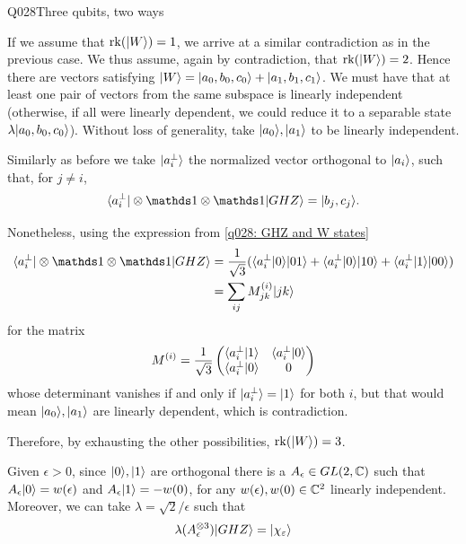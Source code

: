 \begin{entry}{Q028}{Three qubits, two ways}
\begin{solution}[a]
\end{solution}

\begin{solution}[b]
If we assume that $\operatorname{rk}(\lvert W \rangle)=1$, we arrive at a similar contradiction as in the previous case. 
We thus assume, again by contradiction, that $\operatorname{rk}(\lvert W \rangle)=2$. Hence there are vectors satisfying
$\lvert W \rangle= \lvert a_0,b_0,c_0 \rangle+ \lvert a_1,b_1,c_1 \rangle$. We must have that at least one pair of vectors from the same subspace is linearly independent (otherwise, if all were linearly dependent, we could reduce it to a separable state $\lambda\lvert a_0,b_0,c_0 \rangle$). Without loss of generality, take $\lvert a_0 \rangle,\lvert a_1 \rangle$ to be linearly independent.

Similarly as before we take $\lvert a_i^{\perp} \rangle$ the normalized vector orthogonal to $\lvert a_i \rangle$, such that, for $j\neq i$, 
\begin{equation}
     \bra{a_i^{\perp}}\otimes\id \otimes \id\ket{GHZ} = \ket{b_j,c_j}.
\end{equation}

Nonetheless, using the expression from \eqref{q028: GHZ and W states}
\begin{equation}
\begin{split}
    \bra{a_i^{\perp}}\otimes\id \otimes \id\ket{GHZ} &= \frac{1}{\sqrt{3}} (\braket{a_i^{\perp}}{0} \ket{01} + \braket{a_i^{\perp}}{0} \ket{10} + \braket{a_i^{\perp}}{1} \ket{00})\\
    &= \sum_{ij} M^{(i)}_{jk}\ket{jk}
\end{split}
\end{equation}
for the matrix
\begin{equation}
    M^{(i)}=\frac{1}{\sqrt{3}}\begin{pmatrix}
        \langle a_i^{\perp} \vert 1 \rangle &  \langle a_i^{\perp} \vert 0 \rangle\\
        \langle a_i^{\perp} \vert 0 \rangle & 0
    \end{pmatrix}
\end{equation}
whose determinant vanishes if and only if $\lvert a_i^{\perp} \rangle=\lvert 1 \rangle$ for both $i$, but that would mean $\lvert a_0 \rangle,\lvert a_1 \rangle$ are linearly dependent, which is contradiction. 

Therefore, by exhausting the other possibilities, $\operatorname{rk}(\lvert W \rangle)=3$.



\end{solution}




\begin{solution}[c]
Given $\epsilon>0$, since $\lvert 0 \rangle,\lvert 1 \rangle$ are orthogonal there is a $A_\epsilon \in GL(2,\mathbb{C})$ such that $A_\epsilon\lvert 0 \rangle=w(\epsilon)$ and $A_\epsilon\lvert 1 \rangle=-w(0)$, for any $w(\epsilon),w(0)\in \mathbb{C}^{2}$ linearly independent. Moreover, we can take $\lambda = \sqrt{2}/\epsilon$ such that 
\begin{equation}
    \lambda (A_\epsilon^{\otimes3})\lvert GHZ \rangle= |\chi_\varepsilon\rangle
\end{equation}


\end{solution}
\end{entry}
